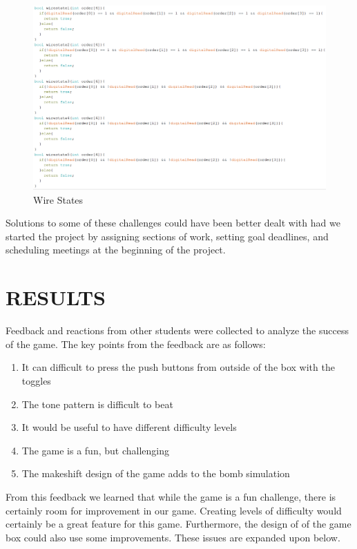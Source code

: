 \documentclass[12pt]{article}
\begin{document}
\begin{figure}[h!]
    \centering
    \includegraphics[width=4.5in]{wire states.PNG}
    \caption{Wire States}
    \label{fig:wires}
\end{figure}

Solutions to some of these challenges could have been better dealt with had we started the project by assigning sections of work, setting goal deadlines, and scheduling meetings at the beginning of the project.

\section{RESULTS}

Feedback and reactions from other students were collected to analyze the success of the game. The key points from the feedback are as follows:
\begin{enumerate}
    \item It can difficult to press the push buttons from outside of the box with the toggles
    \item The tone pattern is difficult to beat
    \item It would be useful to have different difficulty levels
    \item The game is a fun, but challenging
    \item The makeshift design of the game adds to the bomb simulation
\end{enumerate}

From this feedback we learned that while the game is a fun challenge, there is certainly room for improvement in our game.  Creating levels of difficulty would certainly be a great feature for this game. Furthermore, the design of of the game box could also use some improvements.  These issues are expanded upon below.
\end{document}
